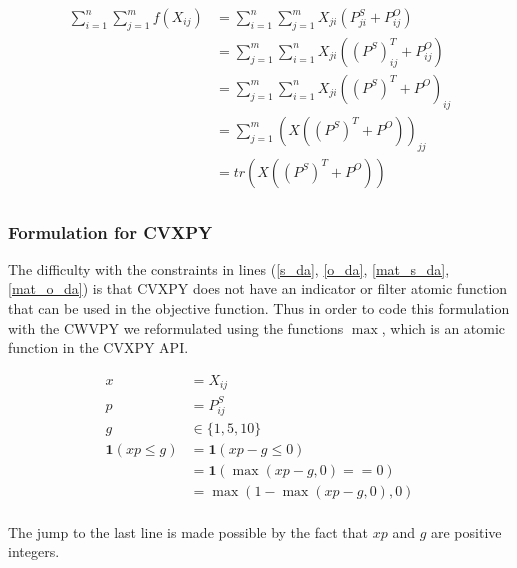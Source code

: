 \begin{align}
\sum_{i = 1}^{n} \sum_{j = 1}^{m} f(X_{ij}) &= \sum_{i = 1}^{n} \sum_{j = 1}^{m} X_{ji}\left(P^S_{ji} + P^O_{ij}\right)\\
&=   \sum_{j = 1}^{m}\sum_{i = 1}^{n} X_{ji}\left(\left(P^S\right)^T_{ij} + P^O_{ij}\right)\\
&=   \sum_{j = 1}^{m}\sum_{i = 1}^{n} X_{ji}\left(\left(P^S\right)^T + P^O\right)_{ij}\\
&=   \sum_{j = 1}^{m} \left( X\left(\left(P^S\right)^T + P^O \right)\right)_{jj}\\
&=   tr\left( X\left(\left(P^S\right)^T + P^O \right)\right)\\
\end{align}

\subsubsection{Formulation for CVXPY}

The difficulty with the constraints in lines (\ref{s_da}, \ref{o_da}, \ref{mat_s_da}, \ref{mat_o_da}) is that CVXPY does not have an indicator or filter atomic function that can be used in the objective function. Thus in order to code this formulation with the CWVPY we reformulated using the functions $\max$, which is an atomic function in the CVXPY API.

\begin{align}
x &= X_{ij} \\
p &= P^S_{ij} \\
g &\in \{1,5,10\} \\
\mathbf{1}(xp \leq g) &= \mathbf{1}(xp - g \leq 0) \\
&=  \mathbf{1}(\max(xp - g , 0) == 0) \\
&=  \max(1 - \max(xp - g , 0), 0) \\
\end{align}

The jump to the last line is made possible by the fact that $xp$ and $g$ are positive integers.